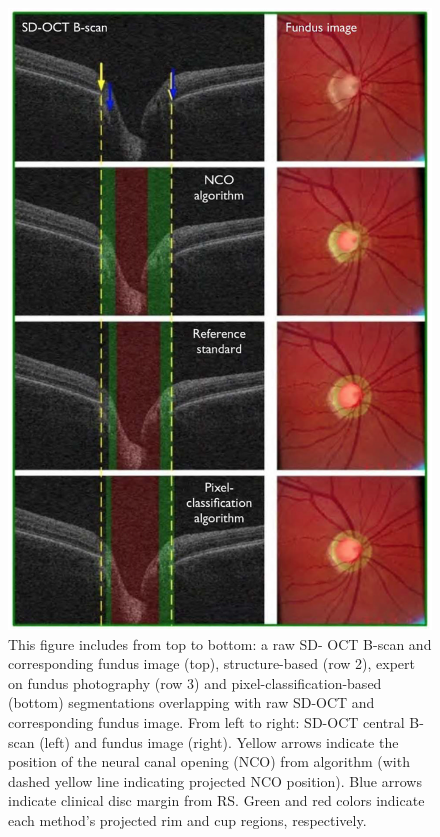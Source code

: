 \begin{figure}[htbp]
\centering
 \includegraphics{figures/morgan_6}
\caption{This figure includes from top to bottom: a raw SD- OCT B-scan and corresponding
fundus image (top), structure-based (row 2), expert on fundus photography (row 3) and
pixel-classification-based (bottom) segmentations overlapping with raw SD-OCT and
corresponding fundus image.  From left to right: SD-OCT central B- scan (left) and
fundus image (right).  Yellow arrows indicate the position of the neural canal opening
(NCO) from algorithm (with dashed yellow line indicating projected NCO position).
Blue arrows indicate clinical disc margin from RS. Green and red colors indicate each
method’s projected rim and cup regions, respectively. \cite{mbib_4} }
\label{fig:m_6}
\end{figure}

